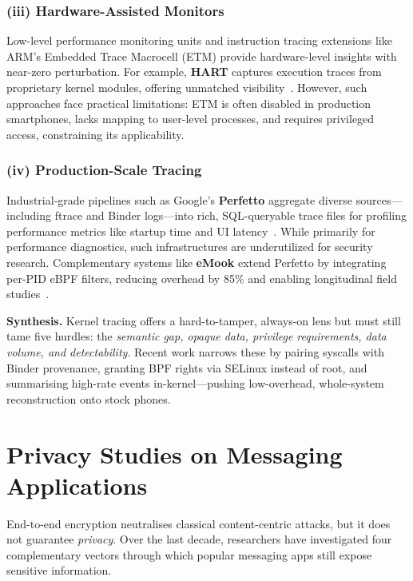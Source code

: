 \documentclass[a4paper,12pt]{report}
\begin{document}
\subsubsection*{(iii) Hardware-Assisted Monitors}
Low-level performance monitoring units and instruction tracing extensions like ARM’s Embedded Trace Macrocell (ETM) provide hardware-level insights with near-zero perturbation. For example, \textbf{HART} captures execution traces from proprietary kernel modules, offering unmatched visibility~\cite{zhang2020hart}. However, such approaches face practical limitations: ETM is often disabled in production smartphones, lacks mapping to user-level processes, and requires privileged access, constraining its applicability.

\subsubsection*{(iv) Production-Scale Tracing}
Industrial-grade pipelines such as Google’s \textbf{Perfetto} aggregate diverse sources—including ftrace and Binder logs—into rich, SQL-queryable trace files for profiling performance metrics like startup time and UI latency~\cite{maganti2022perfetto}. While primarily for performance diagnostics, such infrastructures are underutilized for security research. Complementary systems like \textbf{eMook} extend Perfetto by integrating per-PID eBPF filters, reducing overhead by 85\% and enabling longitudinal field studies~\cite{williams2024emook}.

\medskip
\noindent\textbf{Synthesis.}
Kernel tracing offers a hard-to-tamper, always-on lens but must still tame five hurdles: the \emph{semantic gap, opaque data, privilege requirements, data volume, and detectability}. Recent work narrows these by pairing syscalls with Binder provenance, granting BPF rights via SELinux instead of root, and summarising high-rate events in-kernel—pushing low-overhead, whole-system reconstruction onto stock phones.


\section{Privacy Studies on Messaging Applications}
\label{sec:rw:privacy-im}

End-to-end encryption neutralises classical content-centric attacks, but it does not guarantee \emph{privacy}. Over the last decade, researchers have investigated four complementary vectors through which popular messaging apps still expose sensitive information.
\end{document}
